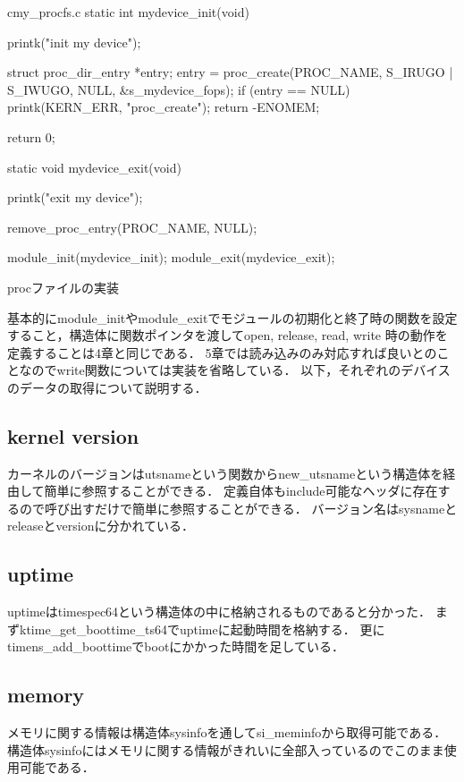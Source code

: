 \begin{longlisting}
\begin{myminted}{c}{my_procfs.c}
static int mydevice_init(void) {
    printk("init my device\n");

    struct proc_dir_entry *entry;
    entry = proc_create(PROC_NAME, S_IRUGO | S_IWUGO, NULL, &s_mydevice_fops);
    if (entry == NULL) {
        printk(KERN_ERR, "proc_create\n");
        return -ENOMEM;
    }

    return 0;
}

static void mydevice_exit(void) {
    printk("exit my device\n");

    remove_proc_entry(PROC_NAME, NULL);
}

module_init(mydevice_init);
module_exit(mydevice_exit);
\end{myminted}
\caption{procファイルの実装}
\label{lst:proc}
\end{longlisting}

基本的にmodule_initやmodule_exitでモジュールの初期化と終了時の関数を設定すること，構造体に関数ポインタを渡してopen, release, read, write
時の動作を定義することは4章と同じである．
5章では読み込みのみ対応すれば良いとのことなのでwrite関数については実装を省略している．
以下，それぞれのデバイスのデータの取得について説明する．

\subsection{kernel version}
カーネルのバージョンはutsnameという関数からnew_utsnameという構造体を経由して簡単に参照することができる．\cite{utsname}
定義自体もinclude可能なヘッダに存在するので呼び出すだけで簡単に参照することができる．
バージョン名はsysnameとreleaseとversionに分かれている．

\subsection{uptime}
uptimeはtimespec64という構造体の中に格納されるものであると分かった．\cite{timespec64}
まずktime_get_boottime_ts64でuptimeに起動時間を格納する．
更にtimens_add_boottimeでbootにかかった時間を足している．\cite{time_add}

\subsection{memory}
メモリに関する情報は構造体sysinfoを通してsi_meminfoから取得可能である．\cite{meminfo}
構造体sysinfoにはメモリに関する情報がきれいに全部入っているのでこのまま使用可能である．
